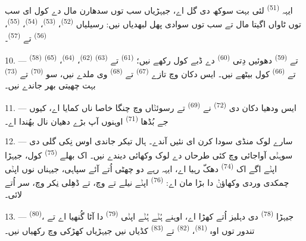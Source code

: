 ایہہ  \textsuperscript{(51)} لئی بہت سوکھ دی گل اے، جیہڑیاں سب توں
سدھارن مال دے کول ای سب توں ٹاواں اگیتا مال تے سب توں سوادی پھل لبھدیاں نیں: رسیلیاں
 \textsuperscript{(52)}،  \textsuperscript{(53)}،
 \textsuperscript{(54)}،  \textsuperscript{(55)}،
 \textsuperscript{(56)} تے  \textsuperscript{(57)}۔

\VUsaut{4.0mm}
\VUsaut{3.0mm}

10. ---  \textsuperscript{(58)} تے  \textsuperscript{(59)}
دھوئیں دِتی  \textsuperscript{(60)} دے ڈبے کول رکھے نیں؛ 
\textsuperscript{(61)} تے  \textsuperscript{(63)} 
\textsuperscript{(62)}،  \textsuperscript{(64)}،
 \textsuperscript{(65)} تے 
\textsuperscript{(66)} کول بیٹھے نیں۔ ایس دکان وچ تازے 
\textsuperscript{(67)} تے  \textsuperscript{(68)} وی ملدے نیں، سو
 \textsuperscript{(70)} تے  \textsuperscript{(73)}
بہت چھیتی بھر جاندے نیں۔

11. --- ایس ودھیا دکان دی  \textsuperscript{(72)} نے
 \textsuperscript{(69)} تے رسوئݨاں وچ چنگا خاصا ناں کمایا اے، کیوں
جے بُڈھا  \textsuperscript{(71)} اوہنوں آپ بڑے دھیان نال بھُندا
اے۔

\VUsaut{4.0mm}
\VUsaut{3.0mm}

12. --- سارے لوک منڈی سودا کرن ای نئیں آندے۔ ہال تیکر جاندی اوس نِکی گلی دی سوہݨی
آواجائی وچ کئی طرحاں دے لوک وکھائی دیندے نیں۔ اک بھلے 
\textsuperscript{(75)} کول، جیہڑا اپݨے اگے اک  \textsuperscript{(74)}
دھکّ رہیا اے، ایہہ رہے دو چھٹی اُتے آئے سپاہی، جیہناں نوں اپݨی چمکدی وردی وکھاؤݨ دا
بڑا مان اے:  \textsuperscript{(76)} اپݨے نیلے  تے
 وچ، تے  ڈھِلی نِکر وچ، سر اُتے
 لائی۔

13. ---  \textsuperscript{(80)}، جیہڑا 
\textsuperscript{(78)} دی دہلیز اُتے کھڑا اے، اوہنے ہُݨے ہُݨے اپݨی 
\textsuperscript{(79)} دا آٹا گُنھیا اے تے تندور توں اوہ 
\textsuperscript{(81)}،  \textsuperscript{(82)} تے
 \textsuperscript{(83)} کڈیاں نیں جیہڑیاں کھڑکی وچ رکھیاں نیں۔


